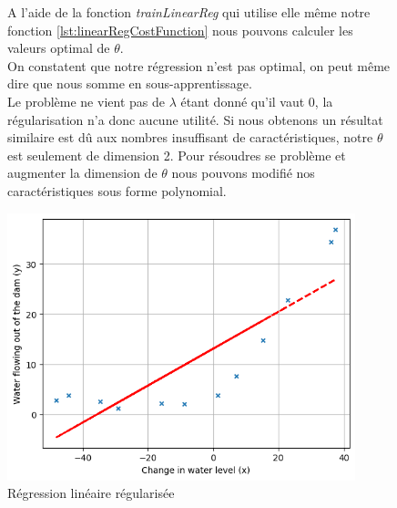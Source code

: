 \begin{figure}[!h]
    \begin{minipage}{.48\linewidth}
        A l'aide de la fonction \textit{trainLinearReg} qui utilise elle même notre fonction \ref{lst:linearRegCostFunction} nous pouvons calculer les valeurs optimal de $\theta$. \\
        On constatent que notre régression n'est pas optimal, on peut même dire que nous somme en sous-apprentissage. \\
        Le problème ne vient pas de $\lambda$ étant donné qu'il vaut 0, la régularisation n'a donc aucune utilité. 
        Si nous obtenons un résultat similaire est dû aux nombres insuffisant de caractéristiques, notre $\theta$ est seulement de dimension 2. Pour résoudres se problème et augmenter la dimension de $\theta$ nous pouvons modifié nos caractéristiques sous forme polynomial.
    \end{minipage}\hfill
    \begin{minipage}{.48\linewidth}
        \begin{center}
            \includegraphics[width=0.9\textwidth]{./img/3.4.png}
            \caption{\label{fig:reg-lin-plot}Régression linéaire régularisée}  
        \end{center}
    \end{minipage}
\end{figure}